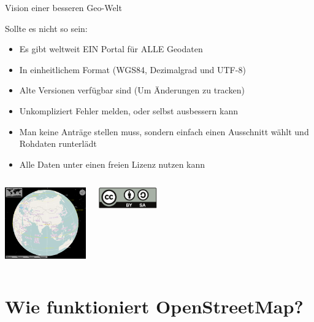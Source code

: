 \documentclass{beamer}
\begin{document}
\begin{frame}{Vision einer besseren Geo-Welt}

 Sollte es nicht so sein:
  \begin{itemize}
    \item Es gibt weltweit EIN Portal für ALLE Geodaten 
    \item In einheitlichem Format (WGS84, Dezimalgrad und UTF-8)
    \item Alte Versionen verfügbar sind (Um Änderungen zu tracken)
    \item Unkompliziert Fehler melden, oder selbst ausbessern kann
\pause
    \item Man keine Anträge stellen muss, sondern einfach einen Ausschnitt wählt und Rohdaten runterlädt
    \item Alle Daten unter einen freien Lizenz nutzen kann
  \end{itemize}

  \begin{columns}[c]
        \begin{center}
  \includegraphics[width=3.5cm]{marble.png}
  \end{center}
      \begin{center}
    \includegraphics[width=2.5cm]{cc-by-sa.pdf}
  \end{center}
\end{columns}

\end{frame}



\section{Wie funktioniert OpenStreetMap?}
\end{document}
